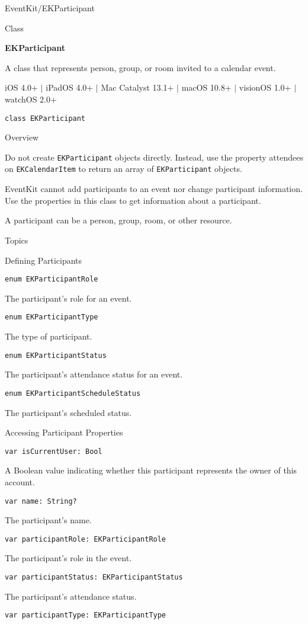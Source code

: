 \documentclass{article}
\title{}
\author{}
\date{}
\begin{document}
EventKit/EKParticipant

Class

\textbf{EKParticipant}

A class that represents person, group, or room invited to a calendar event.

iOS 4.0+ $|$ iPadOS 4.0+ $|$ Mac Catalyst 13.1+ $|$ macOS 10.8+ $|$ visionOS 1.0+ $|$ watchOS 2.0+

\texttt{class EKParticipant}

Overview

Do not create \texttt{EKParticipant} objects directly. Instead, use the property attendees on \texttt{EKCalendarItem} to return an array of \texttt{EKParticipant} objects.

EventKit cannot add participants to an event nor change participant information. Use the properties in this class to get information about a participant.

A participant can be a person, group, room, or other resource.

Topics

Defining Participants

\texttt{enum EKParticipantRole}

The participant's role for an event.

\texttt{enum EKParticipantType}

The type of participant.

\texttt{enum EKParticipantStatus}

The participant's attendance status for an event.

\texttt{enum EKParticipantScheduleStatus}

The participant's scheduled status.

Accessing Participant Properties

\texttt{var isCurrentUser: Bool}

A Boolean value indicating whether this participant represents the owner of this account.

\texttt{var name: String?}

The participant's name.

\texttt{var participantRole: EKParticipantRole}

The participant's role in the event.

\texttt{var participantStatus: EKParticipantStatus}

The participant's attendance status.

\texttt{var participantType: EKParticipantType}
\end{document}
